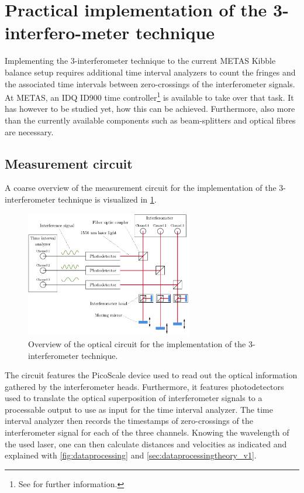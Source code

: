 \documentclass{report}
\numberwithin{tm}{section}
\begin{document}
\section{Practical implementation of the 3-interfero-meter technique}
Implementing the 3-interferometer technique to the current METAS Kibble balance setup requires additional time interval analyzers to count the fringes and the associated time intervals between zero-crossings of the interferometer signals. At METAS, an IDQ ID900 time controller\footnote{See \cite{IDQ.2018} for further information.} is available to take over that task. It has however to be studied yet, how this can be achieved. Furthermore, also more than the currently available components such as beam-splitters and optical fibres are necessary.

\subsection{Measurement circuit}
A coarse overview of the measurement circuit for the implementation of the 3-interferometer technique is visualized in \cref{fig:measurement_circuit}.
\begin{figure}[h]
	\centering
	\includegraphics[width=0.65\textwidth]{figures/measurement_circuit.pdf}
	\caption{Overview of the optical circuit for the implementation of the 3-interferometer technique.}
	\label{fig:measurement_circuit}
\end{figure}
The circuit features the PicoScale device used to read out the optical information gathered by the interferometer heads. Furthermore, it features photodetectors used to translate the optical superposition of interferometer signals to a processable output to use as input for the time interval analyzer. The time interval analyzer then records the timestamps of zero-crossings of the interferometer signal for each of the three channels. Knowing the wavelength of the used laser, one can then calculate distances and velocities as indicated and explained with \cref{fig:dataprocessing} and \cref{sec:dataprocessingtheory_v1}.
\end{document}
